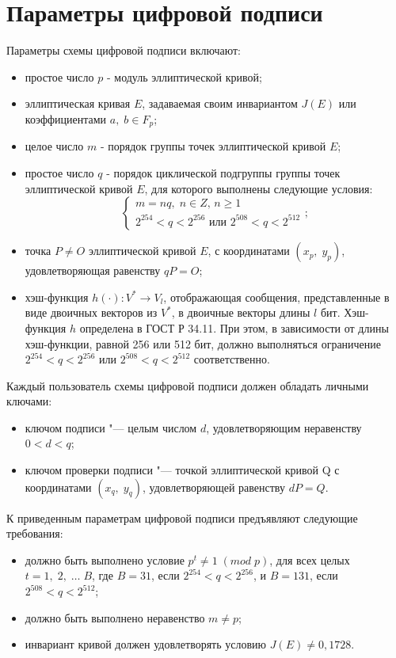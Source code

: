 \section{Параметры цифровой подписи}
\par
Параметры схемы цифровой подписи включают:
\begin{itemize}
	\item простое число $p$ - модуль эллиптической кривой;
	\item эллиптическая кривая $E$, задаваемая своим инвариантом $J(E)$ или коэффициентами $a,\;b\in F_p$;
	\item целое число $m$ - порядок группы точек эллиптической кривой $E$;
	\item простое число $q$ - порядок циклической подгруппы группы точек эллиптической кривой $E$, для которого выполнены следующие условия:
	\[
	\begin{cases}
	m = nq,\;n\in Z,\,n\geqslant 1\\
	2^{254}<q<2^{256} \text{ или } 2^{508} < q < 2^{512}
	\end{cases}
	;
	\]
	\item точка $P \neq O$ эллиптической кривой $E$, с координатами $(x_p,\;y_p)$, удовлетворяющая равенству $qP = O$;
	\item хэш-функция $h(\cdot)\colon V^{*} \to V_l$, отображающая сообщения, представленные в виде двоичных векторов из $V^{*}$, в двоичные векторы длины $l$ бит. Хэш-функция $h$ определена в ГОСТ Р 34.11. При этом, в зависимости от длины хэш-функции, равной 256 или 512 бит, должно выполняться ограничение $2^{254}<q<2^{256}$ или $2^{508} < q < 2^{512}$ соответственно.
\end{itemize}
\par
Каждый пользователь схемы цифровой подписи должен обладать личными ключами:
\begin{itemize}
	\item ключом подписи "--- целым числом $d$, удовлетворяющим неравенству $0<d<q$;
	\item ключом проверки подписи "--- точкой эллиптической кривой Q с координатами $(x_q,\;y_q)$, удовлетворяющей равенству $dP=Q$.
\end{itemize}
\par
К приведенным параметрам цифровой подписи предъявляют следующие требования:
\begin{itemize}
	\item должно быть выполнено условие $p^t\neq 1\;(mod\;p)$, для всех целых $t = 1,\;2,\;\dots\;B$, где $B=31$, если $2^{254}<q<2^{256}$, и $B=131$, если $2^{508}<q<2^{512}$;
	\item должно быть выполнено неравенство $m \neq p$;
	\item инвариант кривой должен удовлетворять условию $J(E)\neq 0,1728$.
\end{itemize}

